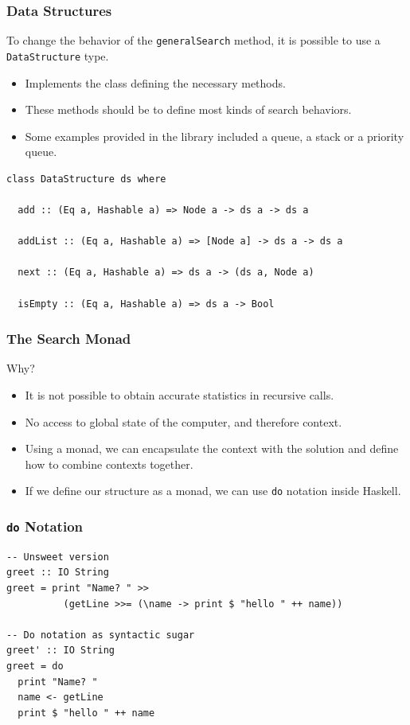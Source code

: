 \documentclass{beamer}
\begin{document}
\begin{frame}[fragile]
  \frametitle{Data Structures}
  To change the behavior of the \texttt{generalSearch} method, it is possible
  to use a \texttt{DataStructure} type.
  \begin{itemize}
  \item Implements the class defining the necessary methods.
  \item These methods should be to define most kinds of search behaviors.
  \item Some examples provided in the library included a queue, a stack or a
    priority queue.
  \end{itemize}
\begin{lstlisting}[style=haskell]
class DataStructure ds where

  add :: (Eq a, Hashable a) => Node a -> ds a -> ds a

  addList :: (Eq a, Hashable a) => [Node a] -> ds a -> ds a

  next :: (Eq a, Hashable a) => ds a -> (ds a, Node a)

  isEmpty :: (Eq a, Hashable a) => ds a -> Bool
\end{lstlisting}
\end{frame}

\begin{frame}
  \frametitle{The Search Monad}
  Why?
  \begin{itemize}
  \item It is not possible to obtain accurate statistics in recursive calls.
  \item No access to global state of the computer, and therefore context.
  \item Using a monad, we can encapsulate the context with the solution and
    define how to combine contexts together.
  \item If we define our structure as a monad, we can use \texttt{do} notation
    inside Haskell.
  \end{itemize}
\end{frame}

\begin{frame}[fragile]
  \frametitle{\texttt{do} Notation}
\begin{lstlisting}[style=haskell]
-- Unsweet version
greet :: IO String
greet = print "Name? " >>
          (getLine >>= (\name -> print $ "hello " ++ name))

-- Do notation as syntactic sugar
greet' :: IO String
greet = do
  print "Name? "
  name <- getLine
  print $ "hello " ++ name
\end{lstlisting}
\end{frame}
\end{document}
